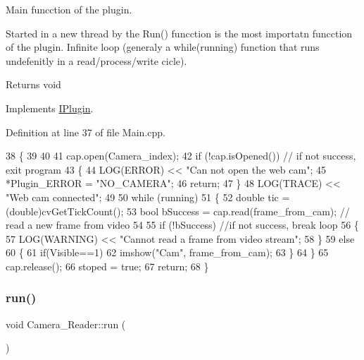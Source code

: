 Main funcction of the plugin. 

Started in a new thread by the Run() funcction is the most importatn funcction of the plugin. Infinite loop (generaly a while(running) function that runs undefenitly in a read/process/write cicle). \begin{DoxyReturn}{Returns}
void 
\end{DoxyReturn}


Implements \hyperlink{class_i_plugin_ab5fdb3b0f7afdcee04324dca01766749}{I\+Plugin}.



Definition at line 37 of file Main.\+cpp.


\begin{DoxyCode}
38 \{
39 
40 
41     cap.open(Camera\_index); 
42     \textcolor{keywordflow}{if} (!cap.isOpened())  \textcolor{comment}{// if not success, exit program}
43     \{
44         LOG(ERROR) << \textcolor{stringliteral}{"Can not open the web cam"};
45         *Plugin\_ERROR = \textcolor{stringliteral}{"NO\_CAMERA"};
46         \textcolor{keywordflow}{return};
47     \}
48     LOG(TRACE) << \textcolor{stringliteral}{"Web cam connected"};
49         
50     \textcolor{keywordflow}{while} (running)
51     \{
52         \textcolor{keywordtype}{double} tic = (double)cvGetTickCount();
53         \textcolor{keywordtype}{bool} bSuccess = cap.read(frame\_from\_cam); \textcolor{comment}{// read a new frame from video}
54 
55         \textcolor{keywordflow}{if} (!bSuccess) \textcolor{comment}{//if not success, break loop}
56         \{
57             LOG(WARNING) << \textcolor{stringliteral}{"Cannot read a frame from video stream"};
58         \}
59         \textcolor{keywordflow}{else} 
60         \{
61             \textcolor{keywordflow}{if}(Visible==1)
62             imshow(\textcolor{stringliteral}{"Cam"}, frame\_from\_cam);          
63         \}
64     \}
65     cap.release();
66     stoped = \textcolor{keyword}{true};
67     \textcolor{keywordflow}{return};
68 \}
\end{DoxyCode}
\mbox{\label{class_camera___reader_a3192d04dc33c238d6f779a72ffc08a5e}} 
\subsubsection{\texorpdfstring{run()}{run()}}
{\footnotesize\ttfamily void Camera\+\_\+\+Reader\+::run (\begin{DoxyParamCaption}{ }\end{DoxyParamCaption})\hspace{0.3cm}{\ttfamily [virtual]}}



